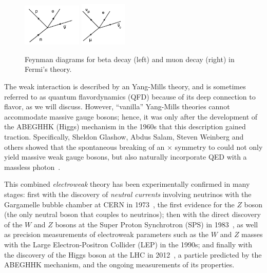 \begin{figure}[ht]
	\centering
	\includegraphics[width=0.25\textwidth]{figures/01-SM-03-SM/ew/beta_decay.png}
	\hspace{1cm}
	\includegraphics[width=0.2\textwidth]{figures/01-SM-03-SM/ew/muon_decay.png}
	\caption{Feynman diagrams for beta decay (left) and muon decay (right) in Fermi's theory.}
	\label{fig:01_sm_ew_fermi}
\end{figure}


The weak interaction is described by an \SU[2] Yang-Mills theory, and is sometimes referred to as quantum flavordynamics (QFD) because of its deep connection to flavor, as we will discuss.
However, ``vanilla'' Yang-Mills theories cannot accommodate massive gauge bosons; hence, it was only after the development of the ABEGHHK (Higgs) mechanism in the 1960s that this description gained traction.
Specifically, Sheldon Glashow, Abdus Salam, Steven Weinberg and others showed that the spontaneous breaking of an \SU[2] $\times$ \UU[1] symmetry to \UU[1] could not only yield massive weak gauge bosons, but also naturally incorporate QED with a massless photon~\cite{Glashow:1959wxa, Salam:1968rm, Weinberg:1967tq}.

This combined \textit{electroweak} theory has been experimentally confirmed in many stages: 
first with the discovery of \textit{neutral currents} involving neutrinos with the Gargamelle bubble chamber at CERN in 1973~\cite{GargamelleNeutrino:1973jyy}, the first evidence for the $Z$ boson (the only neutral boson that couples to neutrinos); 
then with the direct discovery of the $W$ and $Z$ bosons at the Super Proton Synchrotron (SPS) in 1983~\cite{UA1:1983crd, UA1:1983mne, UA2:1983tsx, UA2:1983mlz}, as well as precision measurements of electroweak parameters such as the $W$ and $Z$ masses with the Large Electron-Positron Collider (LEP) in the 1990s; 
and finally with the discovery of the Higgs boson at the LHC in 2012~\cite{CMS:2012qbp, ATLAS:2012yve}, a particle predicted by the ABEGHHK mechanism, and the ongoing measurements of its properties.


